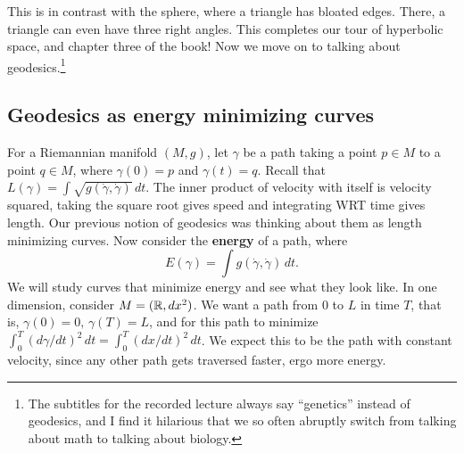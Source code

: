 This is in contrast with the sphere, where a triangle has bloated edges. There, a triangle can even have three right angles. This completes our tour of hyperbolic space, and chapter three of the book! Now we move on to talking about geodesics.\footnote{The subtitles for the recorded lecture always say ``genetics'' instead of geodesics, and I find it hilarious that we so often abruptly switch from talking about math to talking about biology.}

\subsection{Geodesics as energy minimizing curves}
For a Riemannian manifold $(M,g)$, let $\gamma $ be a path taking a point $p \in M$ to a point $q \in M$, where $\gamma (0)=p$ and $\gamma (t)=q$. Recall that $L(\gamma )=\int \sqrt{g(\dot \gamma ,\dot \gamma )}  \, dt$. The inner product of velocity with itself is velocity squared, taking the square root gives speed and integrating WRT time gives length. Our previous notion of geodesics was thinking about them as length minimizing curves. Now consider the \textbf{energy} of a path, where \[
    E(\gamma )=\int g(\dot \gamma ,\dot \gamma ) \, dt.
\] We will study curves that minimize energy and see what they look like. In one dimension, consider $M=(\mathbb{R},dx ^2)$. We want a path from $0$ to $L$ in time $T$, that is, $\gamma (0)=0,\, \gamma (T)=L$, and for this path to minimize $\int_{0}^{T} (d \gamma  /dt)^2 \, dt=\int_{0}^{T} (dx /dt)^2 \, dt$. We expect this to be the path with constant velocity, since any other path gets traversed faster, ergo more energy.

